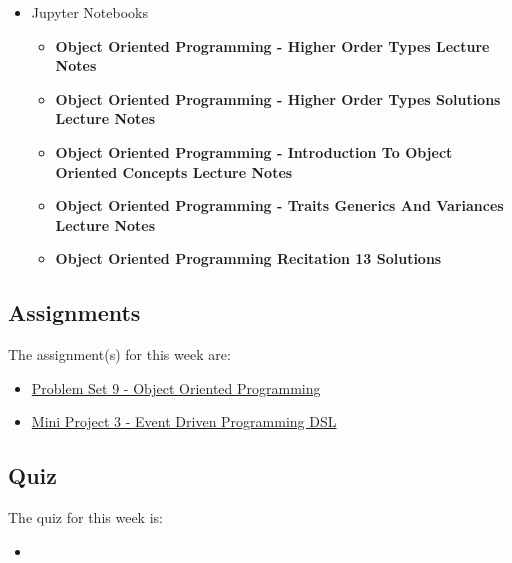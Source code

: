 \begin{itemize}
    \item Jupyter Notebooks
    \begin{itemize}
        \item \textbf{Object Oriented Programming - Higher Order Types Lecture Notes}
        \item \textbf{Object Oriented Programming - Higher Order Types Solutions Lecture Notes}
        \item \textbf{Object Oriented Programming - Introduction To Object Oriented Concepts Lecture Notes}
        \item \textbf{Object Oriented Programming - Traits Generics And Variances Lecture Notes}
        \item \textbf{Object Oriented Programming Recitation 13 Solutions}
    \end{itemize}
\end{itemize}

\subsection{Assignments}

The assignment(s) for this week are:

\begin{itemize}
    \item \href{https://github.com/QuantumCompiler/CU/tree/main/CSPB%203155%20-%20Principles%20Of%20Programming%20Languages/Assignments/Problem%20Sets/Problem%20Set%209%20-%20Object%20Oriented%20Programming}{Problem Set 9 - Object Oriented Programming}
    \item \href{https://github.com/QuantumCompiler/CU/tree/main/CSPB%203155%20-%20Principles%20Of%20Programming%20Languages/Assignments/Mini%20Projects/Mini%20Project%203%20-%20Event%20Driven%20Programming%20DSL}{Mini Project 3 - Event Driven Programming DSL}
\end{itemize}

\subsection{Quiz}

The quiz for this week is:

\begin{itemize}
    \item {}
\end{itemize}

